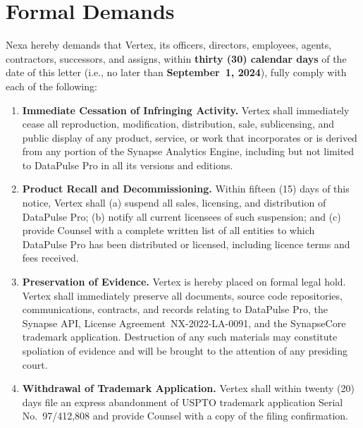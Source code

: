 
\section{Formal Demands}

Nexa hereby demands that Vertex, its officers, directors, employees, agents,
contractors, successors, and assigns, within \textbf{thirty (30) calendar days}
of the date of this letter (i.e., no later than \textbf{September~1, 2024}),
fully comply with each of the following:

\vspace{6pt}

\begin{enumerate}[leftmargin=2.2em, itemsep=10pt, label=\textbf{\arabic*.}]

  \item[\textbf{1.}]
    \textbf{Immediate Cessation of Infringing Activity.}
    Vertex shall immediately cease all reproduction, modification, distribution,
    sale, sublicensing, and public display of any product, service, or work
    that incorporates or is derived from any portion of the Synapse Analytics
    Engine, including but not limited to DataPulse Pro in all its versions and
    editions.

  \item[\textbf{2.}]
    \textbf{Product Recall and Decommissioning.}
    Within fifteen (15) days of this notice, Vertex shall (a) suspend all
    sales, licensing, and distribution of DataPulse Pro; (b) notify all
    current licensees of such suspension; and (c) provide Counsel with a
    complete written list of all entities to which DataPulse Pro has been
    distributed or licensed, including licence terms and fees received.

  \item[\textbf{3.}]
    \textbf{Preservation of Evidence.}
    Vertex is hereby placed on formal legal hold. Vertex shall immediately
    preserve all documents, source code repositories, communications, contracts,
    and records relating to DataPulse Pro, the Synapse API, License
    Agreement~NX-2022-LA-0091, and the SynapseCore trademark application.
    Destruction of any such materials may constitute spoliation of evidence
    and will be brought to the attention of any presiding court.

  \item[\textbf{4.}]
    \textbf{Withdrawal of Trademark Application.}
    Vertex shall within twenty (20) days file an express abandonment of USPTO
    trademark application Serial No.~97/412,808 and provide Counsel with a
    copy of the filing confirmation.


\end{enumerate}
